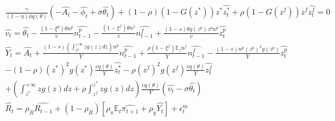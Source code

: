 \documentclass[a4paper]{article}
\begin{document}
\begin{align*}
    &\frac{\gamma}{(1-\eta) \phi q(\theta)} \left( - \widehat{A_t} - \widehat{\phi_t} + \sigma \widehat{\theta_t} \right) + (1-\rho) \left( 1 - G\left( z^* \right) \right) z^* \widehat{z_t^*} + \rho \left( 1 - G\left( z^f \right) \right)  z^f \widehat{z_t^f} = 0\\
    &\widehat{v_t} = \widehat{\theta_t} - \frac{\left(1 - \xi^p \right) \theta n^p}{v} \widehat{n_{t-1}^p} - \frac{\left( 1 - \xi^f \right) \theta n^f}{v} \widehat{n_{t-1}^f} + \frac{(1-s)\theta g\left( z^p \right) z^p n^p}{v} \widehat{z_t^p}\\
    &\widehat{Y_t} = \widehat{A_t} + \frac{(1-s) \left( \int_{z^p}^{+\infty} zg(z) dz \right) n^p}{Y} \widehat{n_{t-1}^p} + \frac{\rho \left( 1 - \xi^f \right) \mathbb{E}_z n^f}{Y} \widehat{n_{t-1}^f} - \frac{(1-s) n^p \left( z^p \right)^2 g\left( z^p \right)}{Y} \widehat{z_t^p}\\
    &- (1-\rho) \left( z^* \right)^2 g\left( z^* \right) \frac{v q(\theta)}{Y} \widehat{z_t^*}- \rho \left( z^f \right)^2 g\left( z^f \right) \frac{v q(\theta)}{Y}\widehat{z_t^f}\\
    &+ \left( \int_{z^*}^{+\infty} zg(z) dz + \rho \int_{z^f}^{z^*} zg(z) dz \right) \frac{v q(\theta)}{Y} \left( \widehat{v_t} - \sigma \widehat{\theta_t} \right)\\
    &\widehat{R_t} = \rho_R \widehat{R_{t-1}} + \left( 1 - \rho_R \right) \left[ \rho_{\pi} \mathbb{E}_t \widehat{\pi_{t+1}} + \rho_{y} \widehat{Y_t} \right] + \epsilon_t^m
\end{align*}
\end{document}
